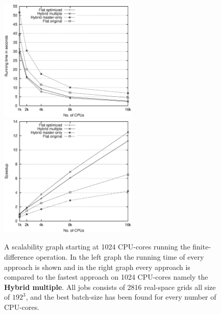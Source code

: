 \documentclass[conference]{IEEEtran}
\begin{document}
\begin{figure}
\centerline{
\mbox{\includegraphics[width=250px]{gfx/fidi_scaleruntime}}
\mbox{\includegraphics[width=250px]{gfx/fidi_scale}}
} 
 \caption{A scalability graph starting at 1024 CPU-cores running the finite-difference operation. In the left graph the running time of every approach is shown and in the right graph every approach is compared to the fastest approach on 1024 CPU-cores namely the \textbf{Hybrid multiple}. All jobs consists of 2816 real-space grids all size of $192^3$, and the best batch-size has been found for every number of CPU-cores.}
 \label{fig:scale}
\end{figure}
\end{document}
